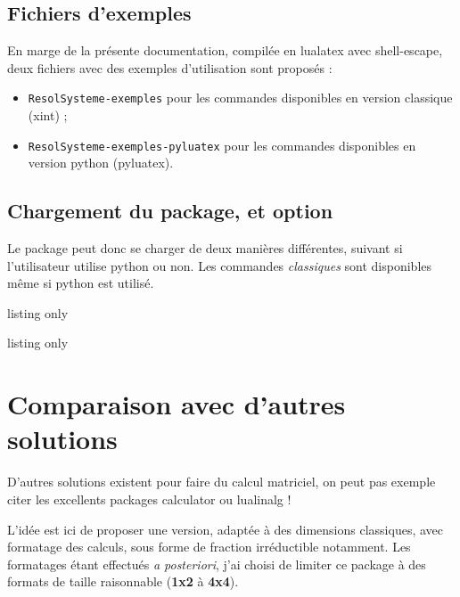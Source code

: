 \documentclass[french,a4paper,11pt]{article}
\begin{document}
\subsection{Fichiers d'exemples}

\begin{noteblock}
En marge de la présente documentation, compilée en \textsf{lualatex} avec \textsf{shell-escape}, deux fichiers avec des exemples d'utilisation sont proposés :

\begin{itemize}
	\item \texttt{ResolSysteme-exemples} pour les commandes disponibles en version classique (\textsf{xint}) ;
	\item \texttt{ResolSysteme-exemples-pyluatex} pour les commandes disponibles en version python (\textsf{pyluatex}).
\end{itemize}
\vspace*{-\baselineskip}\leavevmode
\end{noteblock}

\pagebreak

\subsection{Chargement du package, et option}

\begin{importantblock}
Le package peut donc se charger de deux manières différentes, suivant si l'utilisateur utilise \textsf{python} ou non. Les commandes \textit{classiques} sont disponibles même si \textsf{python} est utilisé.
\end{importantblock}

\begin{PresentationCode}{listing only}
\usepackage{ResolSysteme}
\end{PresentationCode}

\begin{PresentationCode}{listing only}
\usepackage[options]{pyluatex}
\usepackage[pyluatex]{ResolSysteme}
\end{PresentationCode}

\section{Comparaison avec d'autres solutions}

\begin{noteblock}
D'autres solutions existent pour faire du calcul matriciel, on peut pas exemple citer les excellents packages \textsf{calculator} ou \textsf{lualinalg} !

\smallskip

L'idée est ici de proposer une version, adaptée à des dimensions classiques, avec formatage des calculs, sous forme de fraction irréductible notamment. Les formatages étant effectués \textit{a posteriori}, j'ai choisi de limiter ce package à des formats de taille raisonnable (\textbf{1x2} à \textbf{4x4}).
\end{noteblock}
\end{document}
